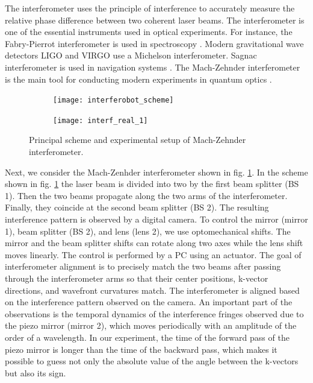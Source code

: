 The interferometer uses the principle of interference to accurately measure the relative phase difference between two coherent laser beams. The interferometer is one of the essential instruments used in optical experiments. For instance, the Fabry-Pierrot interferometer is used in spectroscopy \cite{fabry-perot1899}. Modern gravitational wave detectors LIGO and VIRGO \cite{LIGO, VIRGO} use a Michelson interferometer. Sagnac interferometer is used in navigation systems \cite{Kandpal2000}. The Mach-Zehnder interferometer is the main tool for conducting modern experiments in quantum optics \cite{Ourjoumtsev2006, Sychev2017}.

\begin{figure}[ht]
    \centering
     \begin{subfigure}[b]{0.45\linewidth}
         \centering
         \texttt{[image: interferobot\_scheme]}
     \end{subfigure}
     \centering
     \begin{subfigure}[b]{0.45\linewidth}
         \centering
         \texttt{[image: interf\_real\_1]}
     \end{subfigure}
    \caption{
     Principal scheme and experimental setup of Mach-Zehnder interferometer.}
\label{fig:interf_scheme_1}
\end{figure}

Next, we consider the Mach-Zenhder interferometer shown in fig. \ref{fig:interf_scheme_1}. In the scheme shown in fig. \ref{fig:interf_scheme_1} the laser beam is divided into two by the first beam splitter (BS 1). Then the two beams propagate along the two arms of the interferometer. Finally, they coincide at the second beam splitter (BS 2). The resulting interference pattern is observed by a digital camera. To control the mirror (mirror 1), beam splitter (BS 2), and lens (lens 2), we use optomechanical shifts. The mirror and the beam splitter shifts can rotate along two axes while the lens shift moves linearly. The control is performed by a PC using an actuator. The goal of interferometer alignment is to precisely match the two beams after passing through the interferometer arms so that their center positions, k-vector directions, and wavefront curvatures match. The interferometer is aligned based on the interference pattern observed on the camera. An important part of the observations is the temporal dynamics of the interference fringes observed due to the piezo mirror (mirror 2), which moves periodically with an amplitude of the order of a wavelength. In our experiment, the time of the forward pass of the piezo mirror is longer than the time of the backward pass, which makes it possible to guess not only the absolute value of the angle between the k-vectors but also its sign.

